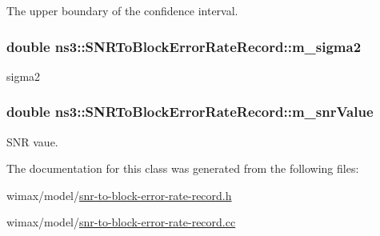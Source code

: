 The upper boundary of the confidence interval. 

\subsubsection[{\texorpdfstring{m\+\_\+sigma2}{m_sigma2}}]{\setlength{\rightskip}{0pt plus 5cm}double ns3\+::\+S\+N\+R\+To\+Block\+Error\+Rate\+Record\+::m\+\_\+sigma2\hspace{0.3cm}{\ttfamily [private]}}\hypertarget{classns3_1_1SNRToBlockErrorRateRecord_ad49c69646813bd7e1688046daa26f4e8}{}\label{classns3_1_1SNRToBlockErrorRateRecord_ad49c69646813bd7e1688046daa26f4e8}


sigma2 

\subsubsection[{\texorpdfstring{m\+\_\+snr\+Value}{m_snrValue}}]{\setlength{\rightskip}{0pt plus 5cm}double ns3\+::\+S\+N\+R\+To\+Block\+Error\+Rate\+Record\+::m\+\_\+snr\+Value\hspace{0.3cm}{\ttfamily [private]}}\hypertarget{classns3_1_1SNRToBlockErrorRateRecord_a1b6988516384bb6115566c985dcdc61b}{}\label{classns3_1_1SNRToBlockErrorRateRecord_a1b6988516384bb6115566c985dcdc61b}


S\+NR vaue. 



The documentation for this class was generated from the following files\+:\begin{DoxyCompactItemize}
\item 
wimax/model/\hyperlink{snr-to-block-error-rate-record_8h}{snr-\/to-\/block-\/error-\/rate-\/record.\+h}\item 
wimax/model/\hyperlink{snr-to-block-error-rate-record_8cc}{snr-\/to-\/block-\/error-\/rate-\/record.\+cc}\end{DoxyCompactItemize}

